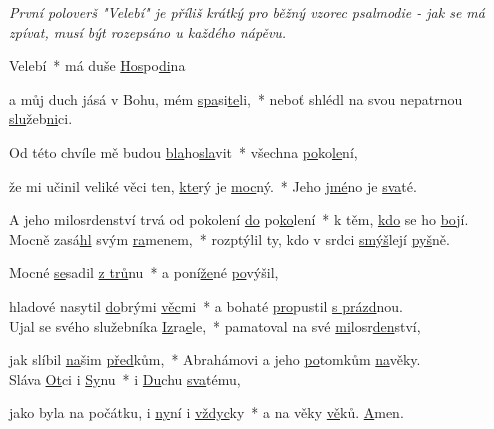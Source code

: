\documentclass[12pt, a4paper]{article}
\begin{document}
\textit{\tiny{První poloverš "Velebí" je příliš krátký pro běžný vzorec
psalmodie - jak se má zpívat, musí být rozepsáno u každého nápěvu.}}

Velebí~* má duše \underline{Hos}po\underline{di}na

a můj duch jásá v Bohu, mém \underline{spa}si\underline{te}li,~* neboť shlédl na svou nepatrnou \underline{slu}žeb\underline{ni}ci.

Od této chvíle mě budou \underline{bla}ho\underline{sla}vit~* všechna \underline{po}ko\underline{le}ní,

že mi učinil veliké věci ten, \underline{kte}rý je \underline{moc}ný.~* Jeho \underline{jmé}no je \underline{sva}té.

A jeho milosrdenství trvá od pokolení \underline{do} po\underline{ko}lení~* k těm, \underline{kdo} se ho \underline{bo}jí.\\



Mocně zasá\underline{hl} svým \underline{ra}menem,~* rozptýlil ty, kdo v srdci \underline{smýš}lejí \underline{pyš}ně.

Mocné \underline{se}sadil \underline{z trů}nu~* a poní\underline{že}né \underline{po}výšil,

hladové nasytil \underline{do}brými \underline{věc}mi~* a bohaté \underline{pro}pustil \underline{s prázd}nou.\\



Ujal se svého služebníka \underline{Iz}ra\underline{e}le,~* pamatoval na své \underline{mi}losr\underline{den}ství,

jak slíbil \underline{na}šim \underline{před}kům,~* Abrahámovi a jeho \underline{po}tomkům \underline{na}věky.\\



Sláva \underline{Ot}ci i \underline{Sy}nu~* i \underline{Du}chu \underline{sva}tému,

jako byla na počátku, i \underline{ny}ní i \underline{vždyc}ky~* a na věky \underline{vě}ků. \underline{A}men.
\end{document}
